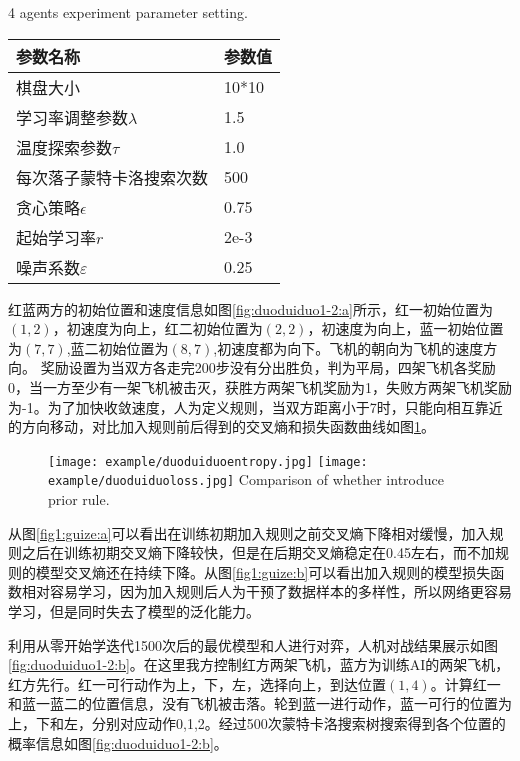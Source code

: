 \begin{table}[htpb]
	\centering
	{4 agents experiment parameter setting.}
	\label{2dui2canshu}
	\begin{tabular}{ll} \toprule
		参数名称   & 参数值  \\  \midrule
		棋盘大小 & 10*10 \\ 
		学习率调整参数$\lambda$ & 1.5 \\  
		温度探索参数$\tau$& 1.0 \\ 
		每次落子蒙特卡洛搜索次数 & 500 \\ 
		贪心策略$\epsilon$ & 0.75 \\  
		起始学习率$r$ & 2e-3\\
		噪声系数$\varepsilon$ &0.25\\
		\bottomrule
	\end{tabular}
\end{table}

红蓝两方的初始位置和速度信息如图\ref{fig:duoduiduo1-2:a}所示，红一初始位置为$(1,2)$，初速度为向上，红二初始位置为$(2,2)$，初速度为向上，蓝一初始位置为$(7,7)$,蓝二初始位置为$(8,7)$,初速度都为向下。飞机的朝向为飞机的速度方向。
奖励设置为当双方各走完200步没有分出胜负，判为平局，四架飞机各奖励0，当一方至少有一架飞机被击灭，获胜方两架飞机奖励为1，失败方两架飞机奖励为-1。为了加快收敛速度，人为定义规则，当双方距离小于7时，只能向相互靠近的方向移动，对比加入规则前后得到的交叉熵和损失函数曲线如图\ref{fig1:guize}。
\begin{figure}[hbpt]
	\centering
	{\texttt{[image: example/duoduiduoentropy.jpg]}}
	\hspace{0.5em}
	{\texttt{[image: example/duoduiduoloss.jpg]}}
	{Comparison of whether introduce prior rule.}
	\label{fig1:guize}
\end{figure}

从图\ref{fig1:guize:a}可以看出在训练初期加入规则之前交叉熵下降相对缓慢，加入规则之后在训练初期交叉熵下降较快，但是在后期交叉熵稳定在0.45左右，而不加规则的模型交叉熵还在持续下降。从图\ref{fig1:guize:b}可以看出加入规则的模型损失函数相对容易学习，因为加入规则后人为干预了数据样本的多样性，所以网络更容易学习，但是同时失去了模型的泛化能力。

利用从零开始学迭代1500次后的最优模型和人进行对弈，人机对战结果展示如图\ref{fig:duoduiduo1-2:b}。在这里我方控制红方两架飞机，蓝方为训练AI的两架飞机，红方先行。红一可行动作为上，下，左，选择向上，到达位置$(1,4)$。计算红一和蓝一蓝二的位置信息，没有飞机被击落。轮到蓝一进行动作，蓝一可行的位置为上，下和左，分别对应动作0,1,2。经过500次蒙特卡洛搜索树搜索得到各个位置的概率信息如图\ref{fig:duoduiduo1-2:b}。

